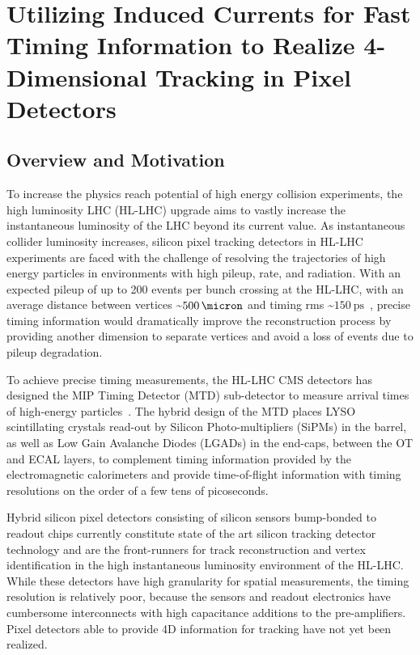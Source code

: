 
\chapter{Utilizing Induced Currents for Fast Timing Information to Realize 4-Dimensional Tracking in Pixel Detectors}

\section{Overview and Motivation}
To increase the physics reach potential of high energy collision experiments, the high luminosity LHC (HL-LHC) upgrade aims to vastly increase the instantaneous luminosity of the LHC beyond its current value. 
As instantaneous collider luminosity increases, silicon pixel tracking detectors in HL-LHC experiments are faced with the challenge of resolving the trajectories of high energy particles in environments with high pileup, rate, and radiation.
With an expected pileup of up to 200 events per bunch crossing at the HL-LHC, with an average distance between vertices \sim$\SI{500}{\micron}$ and timing rms \sim$\SI{150}{\ps}$~\cite{CARTIGLIA201747}, precise timing information would dramatically improve the reconstruction process by providing another dimension to separate vertices and avoid a loss of events due to pileup degradation.

To achieve precise timing measurements, the HL-LHC CMS detectors has designed the MIP Timing Detector (MTD) sub-detector to measure arrival times of high-energy particles~\cite{CMS:2667167}.
The hybrid design of the MTD places LYSO scintillating crystals read-out by Silicon Photo-multipliers (SiPMs) in the barrel, as well as Low Gain Avalanche Diodes (LGADs) in the end-caps, between the OT and ECAL layers, to complement timing information provided by the electromagnetic calorimeters and provide time-of-flight information with timing resolutions on the order of a few tens of picoseconds.

Hybrid silicon pixel detectors consisting of silicon sensors bump-bonded to readout chips currently constitute state of the art silicon tracking detector technology and are the front-runners for track reconstruction and vertex identification in the high instantaneous luminosity environment of the HL-LHC.
While these detectors have high granularity for spatial measurements, the timing resolution is relatively poor, because the sensors and readout electronics have cumbersome interconnects with high capacitance additions to the pre-amplifiers. 
Pixel detectors able to provide 4D information for tracking have not yet been realized.

